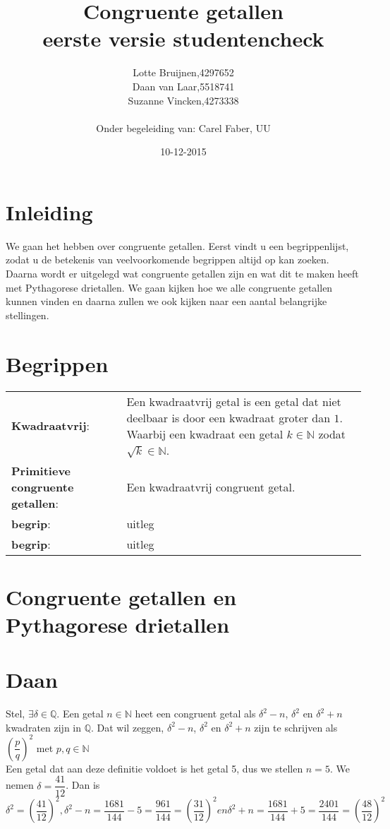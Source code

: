 \documentclass[12pt,reqno]{article}
\title{\textbf{Congruente getallen}\\
		\small{eerste versie studentencheck}}
\author{
	\begin{tabular}{ l l }
		Lotte Bruijnen, & 4297652 \\
		Daan van Laar, & 5518741 \\
		Suzanne Vincken, & 4273338
	\end{tabular}\\
	Onder begeleiding van: Carel Faber, UU
}
\date{10-12-2015}
\newcommand*{\NN}{\ensuremath{\mathbb{N}}}
\newcommand*{\QQ}{\ensuremath{\mathbb{Q}}}
\begin{document}
	
	\maketitle
	\allowdisplaybreaks
	
	\section{Inleiding}
	We gaan het hebben over congruente getallen. Eerst vindt u een begrippenlijst, zodat u de betekenis van veelvoorkomende begrippen altijd op kan zoeken. Daarna wordt er uitgelegd wat congruente getallen zijn en wat dit te maken heeft met Pythagorese drietallen. We gaan kijken hoe we alle congruente getallen kunnen vinden en daarna zullen we ook kijken naar een aantal belangrijke stellingen.
	
	
	\section{Begrippen}
	\begin{tabular}{ p{} p{10cm} }
		\textbf{Kwadraatvrij}: \cite{Beukers} & Een kwadraatvrij getal is een getal dat niet deelbaar is door een kwadraat groter dan $1$. Waarbij een kwadraat een getal $k\in\NN$ zodat $\sqrt{k}\in\NN$. \\
		\textbf{Primitieve congruente getallen}: & Een kwadraatvrij congruent getal. \\
		\textbf{begrip}: & uitleg \\
		\textbf{begrip}: & uitleg
	\end{tabular}
	
	\section{Congruente getallen en Pythagorese drietallen}
	\section{Daan}
	
	Stel, $\exists \delta \in \QQ$. Een getal $n \in \NN$ heet een congruent getal als $\delta^2 - n$, $\delta^2$ en $\delta^2 + n$ kwadraten zijn in \QQ. Dat wil zeggen, $\delta^2 - n$, $\delta^2$ en $\delta^2 + n$ zijn te schrijven als $\left(\dfrac{p}{q}\right)^2$ met $p, q \in \NN$\\
	Een getal dat aan deze definitie voldoet is het getal 5, dus we stellen $n = 5$. We nemen $\delta = \dfrac{41}{12}$. Dan is $\delta^2 = \left( \dfrac{41}{12} \right)^2, \delta^2 - n = \dfrac{1681}{144} - 5 = \dfrac{961}{144} = \left( \dfrac{31}{12}\right)^2	en  \delta^2 + n = \dfrac{1681}{144} + 5 = \dfrac{2401}{144} = \left( \dfrac{48}{12}\right)^2$
	
\end{document}
